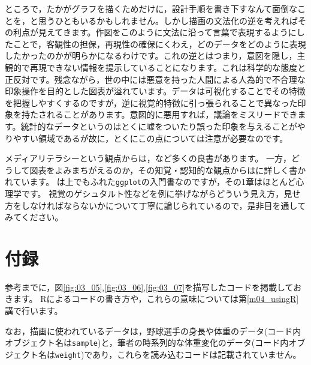 \documentclass{ltjsbook}
\begin{document}
ところで，たかがグラフを描くためだけに，設計手順を書き下すなんて面倒なことを，と思うひともいるかもしれません。しかし描画の文法化の逆を考えればその利点が見えてきます。作図をこのように文法に沿って言葉で表現するようにしたことで，客観性の担保，再現性の確保にくわえ，どのデータをどのように表現したかったのかが明らかになるわけです。これの逆とはつまり，意図を隠し，主観的で再現できない情報を提示していることになります。これは科学的な態度と正反対です。残念ながら，世の中には悪意を持った人間による人為的で不合理な印象操作を目的とした図表が溢れています。データは可視化することでその特徴を把握しやすくするのですが，逆に視覚的特徴に引っ張られることで異なった印象を持たされることがあります。意図的に悪用すれば，議論をミスリードできます。統計的なデータというのはとくに嘘をついたり誤った印象を与えることがやりやすい領域であるが故に，とくにこの点については注意が必要なのです。

メディアリテラシーという観点からは，\textcite{Takagi196807}など多くの良書があります。
一方，どうして図表をよみまちがえるのか，その知覚・認知的な観点からは\textcite{Kieran2018}に詳しく書かれています。
\textcite{Kieran2018}は上でもふれた\texttt{ggplot}の入門書なのですが，その1章はほとんど心理学です。
視覚のゲシュタルト性などを例に挙げながらどういう見え方，見せ方をしなければならないかについて丁寧に論じられているので，是非目を通してみてください。

\section{付録}

参考までに，図\ref{fig:03_05},\ref{fig:03_06},\ref{fig:03_07}を描写したコードを掲載しておきます。
Rによるコードの書き方や，これらの意味については第\ref{m04_usingR}講で行います。

なお，描画に使われているデータは，野球選手の身長や体重のデータ(コード内オブジェクト名は\texttt{sample})と，筆者の時系列的な体重変化のデータ(コード内オブジェクト名は\texttt{weight})であり，これらを読み込むコードは記載されていません。
\end{document}
